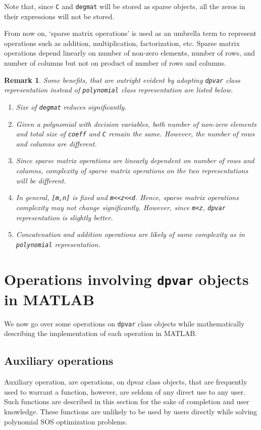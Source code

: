 \documentclass{article}
\newtheorem{rem}{Remark}
\begin{document}
	Note that, since \texttt{C} and \texttt{degmat} will be stored as sparse objects, all the zeros in their expressions will not be stored. 

	From now on, `sparse matrix operations' is used as an umbrella term to represent operations such as addition, multiplication, factorization, etc. Sparse matrix operations depend linearly on number of non-zero elements, number of rows, and number of columns but not on product of number of rows and columns.
	
	\begin{rem} Some benefits, that are outright evident by adopting \texttt{dpvar} class representation instead of \texttt{polynomial} class representation are listed below.
		\begin{enumerate}
			\item Size of \texttt{degmat} reduces significantly.
			\item Given a polynomial with decision variables, both number of non-zero elements and total size of \texttt{coeff} and \texttt{C} remain the same. However, the number of rows and columns are different.
			\item Since sparse matrix operations are linearly dependent on number of rows and columns, complexity of sparse matrix operations on the two representations will be different.
			\item In general, \texttt{[m,n]} is fixed and \texttt{m<<z<<d}. Hence, sparse matrix operations complexity may not change significantly. However, since \texttt{m<z}, \texttt{dpvar} representation is slightly better.
			\item Concatenation and addition operations are likely of same complexity as in \texttt{polynomial} representation.
		\end{enumerate}
	\end{rem}
	
	
	
	
	\section{Operations involving \texttt{dpvar} objects in MATLAB}\label{sec:operations}
	
	We now go over some operations on \texttt{dpvar} class objects while mathematically describing the implementation of each operation in MATLAB.
	
	\subsection{Auxiliary operations}\label{subsec:aux-operations}
	Auxiliary operation, are operations, on dpvar class objects, that are frequently used to warrant a function, however, are seldom of any direct use to any user. Such functions are described in this section for the sake of completion and user knowledge. These functions are unlikely to be used by users directly while solving polynomial SOS optimization problems.
\end{document}
